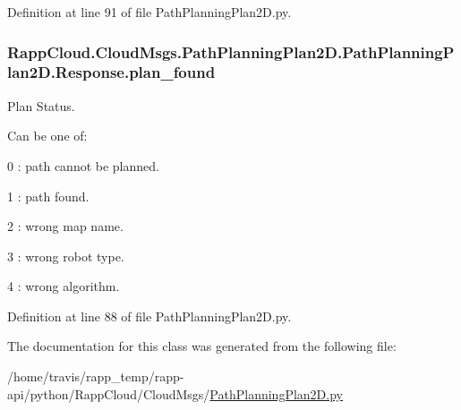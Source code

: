 Definition at line 91 of file Path\-Planning\-Plan2\-D.\-py.

\hypertarget{classRappCloud_1_1CloudMsgs_1_1PathPlanningPlan2D_1_1PathPlanningPlan2D_1_1Response_ad2fe3ee424693c977bee08ffd3a23c1d}{
\subsubsection[{plan\-\_\-found}]{\setlength{\rightskip}{0pt plus 5cm}Rapp\-Cloud.\-Cloud\-Msgs.\-Path\-Planning\-Plan2\-D.\-Path\-Planning\-Plan2\-D.\-Response.\-plan\-\_\-found}}\label{classRappCloud_1_1CloudMsgs_1_1PathPlanningPlan2D_1_1PathPlanningPlan2D_1_1Response_ad2fe3ee424693c977bee08ffd3a23c1d}


Plan Status. 

Can be one of\-:
\begin{DoxyItemize}
\item 0 \-: path cannot be planned.
\item 1 \-: path found.
\item 2 \-: wrong map name.
\item 3 \-: wrong robot type.
\item 4 \-: wrong algorithm. 
\end{DoxyItemize}

Definition at line 88 of file Path\-Planning\-Plan2\-D.\-py.



The documentation for this class was generated from the following file\-:\begin{DoxyCompactItemize}
\item 
/home/travis/rapp\-\_\-temp/rapp-\/api/python/\-Rapp\-Cloud/\-Cloud\-Msgs/\hyperlink{PathPlanningPlan2D_8py}{Path\-Planning\-Plan2\-D.\-py}\end{DoxyCompactItemize}
